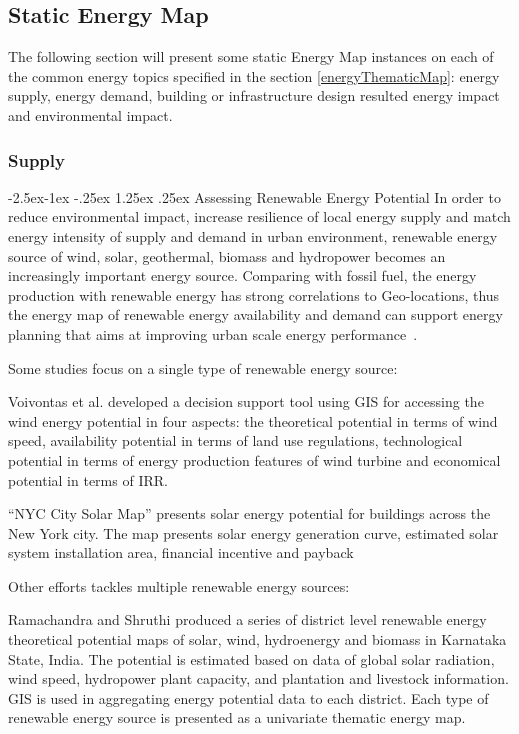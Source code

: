 \documentclass[hidelinks,12pt]{article}
\makeatletter
\renewcommand\paragraph{\@startsection{paragraph}{4}{\z@}%
            {-2.5ex\@plus -1ex \@minus -.25ex}%
            {1.25ex \@plus .25ex}%
            {\normalfont\normalsize\bfseries}}
\makeatother
\begin{document}
\subsection{Static Energy Map}\label{staticEnergyMap}
The following section will present some static Energy Map instances on
each of the common energy topics specified in the section
\ref{energyThematicMap}: energy supply, energy demand, building or infrastructure design
resulted energy impact and environmental impact. 

\subsubsection{Supply}
\paragraph{Assessing Renewable Energy Potential}
In order to reduce environmental impact, increase resilience of local
energy supply and match energy intensity of supply and demand in urban
environment, renewable energy source of wind, solar, geothermal,
biomass and hydropower becomes an increasingly important energy
source. Comparing with fossil fuel, the energy production with
renewable energy has strong correlations to Geo-locations, thus the
energy map of renewable energy availability and demand can support
energy planning that aims at improving urban scale energy
performance~\cite{Ramachandra20071460}.

Some studies focus on a single type of renewable energy source:

Voivontas et al. developed a decision support tool using GIS for
accessing the wind energy potential in four aspects: the theoretical
potential in terms of wind speed, availability potential in terms of
land use regulations, technological potential in terms of energy
production features of wind turbine and economical potential in terms
of IRR. 

``NYC City Solar Map'' presents solar energy potential for
buildings across the New York city. The map presents solar energy
generation curve, estimated solar system installation area, financial
incentive and payback~\cite{NYCSolarMap}

Other efforts tackles multiple renewable energy sources:

Ramachandra and Shruthi produced a series of district level renewable
energy theoretical potential maps of solar, wind, hydroenergy and
biomass in Karnataka State, India. The potential is estimated based on
data of global solar radiation, wind speed, hydropower plant capacity,
and plantation and livestock information. GIS is used in aggregating
energy potential data to each district. Each type of renewable energy
source is presented as a univariate thematic energy map.
\end{document}
